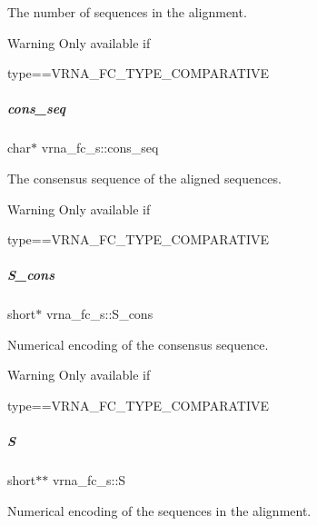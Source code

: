 The number of sequences in the alignment. 

\begin{DoxyWarning}{Warning}
Only available if\begin{DoxyVerb}type==VRNA_FC_TYPE_COMPARATIVE \end{DoxyVerb}
 
\end{DoxyWarning}
\mbox{\label{group__fold__compound_ac472afde64d8b3c8b84e4809fda7d814}} 
\subparagraph{\texorpdfstring{cons\_seq}{cons\_seq}}
{\footnotesize\ttfamily char$\ast$ vrna\+\_\+fc\+\_\+s\+::cons\+\_\+seq}



The consensus sequence of the aligned sequences. 

\begin{DoxyWarning}{Warning}
Only available if\begin{DoxyVerb}type==VRNA_FC_TYPE_COMPARATIVE \end{DoxyVerb}
 
\end{DoxyWarning}
\mbox{\label{group__fold__compound_aa3fab7ae38ebfed2028375221d295686}} 
\subparagraph{\texorpdfstring{S\_cons}{S\_cons}}
{\footnotesize\ttfamily short$\ast$ vrna\+\_\+fc\+\_\+s\+::\+S\+\_\+cons}



Numerical encoding of the consensus sequence. 

\begin{DoxyWarning}{Warning}
Only available if\begin{DoxyVerb}type==VRNA_FC_TYPE_COMPARATIVE \end{DoxyVerb}
 
\end{DoxyWarning}
\mbox{\label{group__fold__compound_aebb37297f92c7bd22aac6343f8f61d61}} 
\subparagraph{\texorpdfstring{S}{S}}
{\footnotesize\ttfamily short$\ast$$\ast$ vrna\+\_\+fc\+\_\+s\+::S}



Numerical encoding of the sequences in the alignment. 

